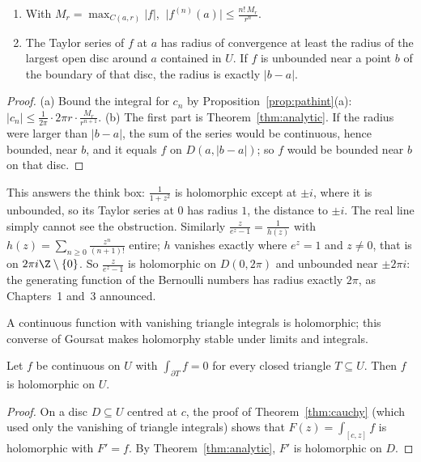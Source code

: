 \begin{corollary}\label{cor:radius}
\begin{enumerate}[label=(\alph*)]
\item With $M_r=\max_{C(a,r)}|f|$, $\ \bigl|f^{(n)}(a)\bigr|\le\frac{n!\,M_r}{r^n}$.
\item The Taylor series of $f$ at $a$ has radius of convergence at least the radius of the largest open disc around $a$ contained in
$U$. If $f$ is unbounded near a point $b$ of the boundary of that disc, the radius is exactly $|b-a|$.
\end{enumerate}
\end{corollary}
\begin{proof}
(a) Bound the integral for $c_n$ by Proposition~\ref{prop:pathint}(a): $|c_n|\le\frac1{2\pi}\cdot2\pi r\cdot\frac{M_r}{r^{n+1}}$. (b) The first part is
Theorem~\ref{thm:analytic}. If the radius were larger than $|b-a|$, the sum of the series would be continuous, hence bounded, near $b$,
and it equals $f$ on $D(a,|b-a|)$; so $f$ would be bounded near $b$ on that disc.
\end{proof}

\begin{example}
This answers the think box: $\frac1{1+z^2}$ is holomorphic except at $\pm i$, where it is unbounded, so its Taylor series at $0$
has radius $1$, the distance to $\pm i$. The real line simply cannot see the obstruction. Similarly $\frac z{e^z-1}=\frac1{h(z)}$ with
$h(z)=\sum_{n\ge0}\frac{z^n}{(n+1)!}$ entire; $h$ vanishes exactly where $e^z=1$ and $z\ne0$, that is on $2\pi i\Z\setminus\{0\}$. So $\frac z{e^z-1}$ is holomorphic on $D(0,2\pi)$
and unbounded near $\pm2\pi i$: the generating function of the Bernoulli numbers has radius exactly $2\pi$, as Chapters~1 and~3
announced.
\end{example}

A continuous function with vanishing triangle integrals is holomorphic; this converse of Goursat makes holomorphy
stable under limits and integrals.

\begin{theorem}[Morera]\label{thm:morera}
Let $f$ be continuous on $U$ with $\int_{\partial T}f=0$ for every closed triangle $T\subseteq U$. Then $f$ is holomorphic on $U$.
\end{theorem}
\begin{proof}
On a disc $D\subseteq U$ centred at $c$, the proof of Theorem~\ref{thm:cauchy} (which used only the vanishing of triangle integrals)
shows that $F(z)=\int_{[c,z]}f$ is holomorphic with $F'=f$. By Theorem~\ref{thm:analytic}, $F'$ is holomorphic on $D$.
\end{proof}

